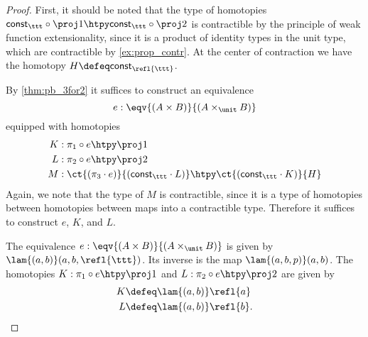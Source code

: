 \begin{proof}
First, it should be noted that the type of homotopies $\mathsf{const}_\ttt\circ\proj 1\htpy \mathsf{const}_\ttt\circ\proj 2$ is contractible by the principle of weak function extensionality, since it is a product of identity types in the unit type, which are contractible by \cref{ex:prop_contr}. At the center of contraction we have the homotopy $H\defeq \mathsf{const}_{\refl{\ttt}}$.

By \cref{thm:pb_3for2} it suffices to construct an equivalence 
\begin{equation*}
e:\eqv{(A\times B)}{(A\times_\unit B)}
\end{equation*}
equipped with homotopies
\begin{align*}
K & : \pi_1\circ e \htpy \proj 1 \\
L & : \pi_2\circ e \htpy \proj 2 \\
M & : \ct{(\pi_3\cdot e)}{(\mathsf{const}_\ttt\cdot L)}\htpy \ct{(\mathsf{const}_\ttt\cdot K)}{H}
\end{align*}
Again, we note that the type of $M$ is contractible, since it is a type of homotopies between homotopies between maps into a contractible type. Therefore it suffices to construct $e$, $K$, and $L$.

The equivalence $e:\eqv{(A\times B)}{(A\times_\unit B)}$ is given by $\lam{(a,b)}(a,b,\refl{\ttt})$. Its inverse is the map $\lam{(a,b,p)}(a,b)$. The homotopies $K:\pi_1\circ e\htpy \proj 1$ and $L:\pi_2\circ e\htpy \proj 2$ are given by
\begin{align*}
K & \defeq \lam{(a,b)}\refl{a} \\
L & \defeq \lam{(a,b)}\refl{b}.\qedhere
\end{align*}
\end{proof}

